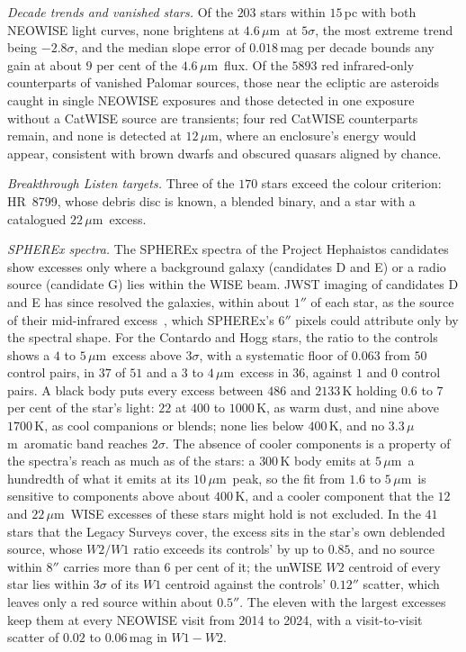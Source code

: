 \documentclass[3p,11pt]{elsarticle}
\newcommand{\um}{\,$\mu$m}
\begin{document}
\emph{Decade trends and vanished stars.} Of the $203$ stars within $15$\,pc with both
NEOWISE light curves, none brightens at $4.6$\um\ at $5\sigma$, the most extreme trend
being $-2.8\sigma$, and the median slope error of $0.018$\,mag per decade bounds any gain
at about $9$ per cent of the $4.6$\um\ flux. Of the $5893$ red infrared-only
counterparts of vanished Palomar sources, those near the ecliptic are asteroids caught
in single NEOWISE exposures and those detected in one exposure without a CatWISE source
are transients; four red CatWISE counterparts remain, and none is detected at $12$\um,
where an enclosure's energy would appear, consistent with brown dwarfs and obscured
quasars aligned by chance.

\emph{Breakthrough Listen targets.} Three of the $170$ stars exceed the colour criterion:
HR~8799, whose debris disc is known, a blended binary, and a star with a catalogued
$22$\um\ excess.

\emph{SPHEREx spectra.} The SPHEREx spectra of the Project Hephaistos candidates show
excesses only where a background galaxy (candidates D and E) or a radio source
(candidate G) lies within the WISE beam. JWST imaging of candidates D and E has since
resolved the galaxies, within about $1''$ of each star, as the source of their
mid-infrared excess~\cite{Zackrisson2026}, which SPHEREx's $6''$ pixels could attribute
only by the spectral shape. For the Contardo and Hogg stars, the ratio to
the controls shows a $4$ to $5$\um\ excess above $3\sigma$, with a systematic floor of
$0.063$ from $50$ control pairs, in $37$ of $51$ and a $3$ to $4$\um\ excess in $36$,
against $1$ and $0$ control pairs. A black body puts every excess between $486$ and
$2133$\,K holding $0.6$ to $7$ per cent of the star's light: $22$ at $400$ to $1000$\,K,
as warm dust, and nine above $1700$\,K, as cool companions or blends; none lies below
$400$\,K, and no $3.3$\um\ aromatic band reaches $2\sigma$. The absence of cooler
components is a property of the spectra's reach as much as of the stars: a $300$\,K
body emits at $5$\um\ a hundredth of what it emits at its $10$\um\ peak, so the fit from
$1.6$ to $5$\um\ is sensitive to components above about $400$\,K, and a cooler
component that the $12$ and $22$\um\ WISE excesses of these stars might hold is not
excluded. In the $41$ stars that the
Legacy Surveys cover, the excess sits in the star's own deblended source, whose $W2/W1$
ratio exceeds its controls' by up to $0.85$, and no source within $8''$ carries more than
$6$ per cent of it; the unWISE $W2$ centroid of every star lies within $3\sigma$ of its
$W1$ centroid against the controls' $0.12''$ scatter, which leaves only a red source
within about $0.5''$. The eleven with the largest excesses keep them at every NEOWISE
visit from 2014 to 2024, with a visit-to-visit scatter of $0.02$ to $0.06$\,mag in
$W1-W2$.
\end{document}
